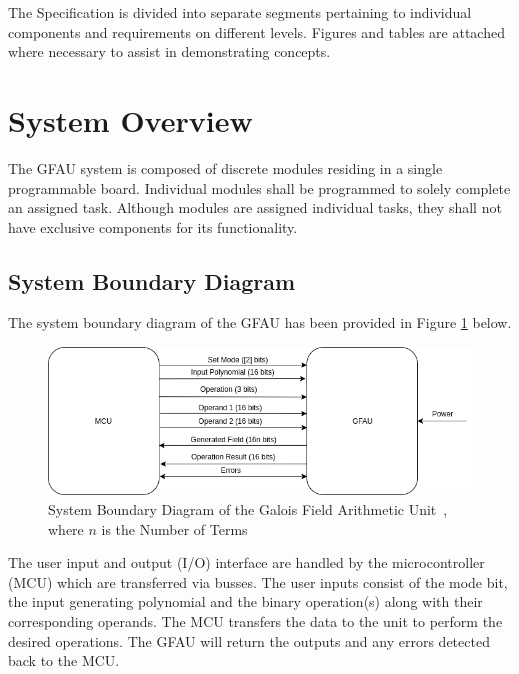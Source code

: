 \documentclass[12pt]{extarticle}
\newcommand{\team}{Galois Field Arithmetic Unit}
\begin{document}
        The Specification is divided into separate segments pertaining to
        individual components and requirements on different levels. Figures and
        tables are attached where necessary to assist in demonstrating
        concepts.

        \section{System Overview} The GFAU system is composed of discrete
        modules residing in a single programmable board. Individual modules
        shall be programmed to solely complete an assigned task. Although
        modules are assigned individual tasks, they shall not have exclusive
        components for its functionality.

        \subsection{System Boundary Diagram} The system boundary diagram of the
        GFAU has been provided in Figure \ref{fig:system_boundary} below.

        \begin{figure}[ht]
            \begin{center}
                \includegraphics[width=1\textwidth]{system_boundary.png}
                \caption{System Boundary Diagram of the \team~, where $n$ is
                the Number of Terms} \label{fig:system_boundary}
            \end{center}
        \end{figure}

        The user input and output (I/O) interface are handled by the
        microcontroller (MCU) which are transferred via busses. The user inputs
        consist of the mode bit, the input generating polynomial and the binary
        operation(s) along with their corresponding operands. The MCU transfers
        the data to the unit to perform the desired operations. The GFAU will
        return the outputs and any errors detected back to the MCU.
        \newpage
\end{document}

